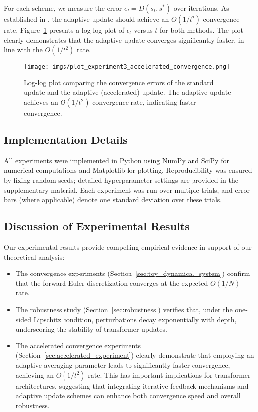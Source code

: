 For each scheme, we measure the error \(e_t = D(s_t, s^*)\) over iterations. As established in \cite{feinashley2025iterate}, the adaptive update should achieve an \(O(1/t^2)\) convergence rate. Figure~\ref{fig:accelerated_convergence} presents a log-log plot of \(e_t\) versus \(t\) for both methods. The plot clearly demonstrates that the adaptive update converges significantly faster, in line with the \(O(1/t^2)\) rate.

\begin{figure}[ht]
  \centering
  \texttt{[image: imgs/plot\_experiment3\_accelerated\_convergence.png]}
  \caption{Log-log plot comparing the convergence errors of the standard update and the adaptive (accelerated) update. The adaptive update achieves an \(O(1/t^2)\) convergence rate, indicating faster convergence.}
  \label{fig:accelerated_convergence}
\end{figure}

\subsection{Implementation Details}

All experiments were implemented in Python using NumPy and SciPy for numerical computations and Matplotlib for plotting. Reproducibility was ensured by fixing random seeds; detailed hyperparameter settings are provided in the supplementary material. Each experiment was run over multiple trials, and error bars (where applicable) denote one standard deviation over these trials.

\subsection{Discussion of Experimental Results}

Our experimental results provide compelling empirical evidence in support of our theoretical analysis:
\begin{itemize}[leftmargin=2em]
    \item The convergence experiments (Section~\ref{sec:toy_dynamical_system}) confirm that the forward Euler discretization converges at the expected \(O(1/N)\) rate.
    \item The robustness study (Section~\ref{sec:robustness}) verifies that, under the one-sided Lipschitz condition, perturbations decay exponentially with depth, underscoring the stability of transformer updates.
    \item The accelerated convergence experiments (Section~\ref{sec:accelerated_experiment}) clearly demonstrate that employing an adaptive averaging parameter leads to significantly faster convergence, achieving an \(O(1/t^2)\) rate. This has important implications for transformer architectures, suggesting that integrating iterative feedback mechanisms and adaptive update schemes can enhance both convergence speed and overall robustness.
\end{itemize}

